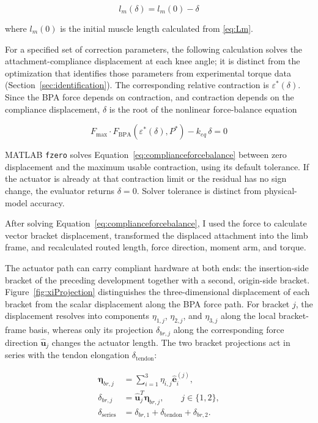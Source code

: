 \begin{equation} l_m(\delta) = l_m{(0)} - \delta
\label{eq:activelengthcorrected}
\end{equation}

where $l_m{(0)}$ is the initial muscle length calculated from \eqref{eq:Lm}.

For a specified set of correction parameters, the following calculation solves the attachment-compliance displacement at each knee angle; it is distinct from the optimization that identifies those parameters from experimental torque data (Section~\ref{sec:identification}). The corresponding relative contraction is $\varepsilon^*(\delta)$. Since the BPA force depends on contraction, and contraction depends on the compliance displacement, $\delta$ is the root of the nonlinear force-balance equation

\begin{equation} F_{\mathrm{max}} \cdot F_{\mathrm{BPA}}\!\left(\varepsilon^*(\delta),P^*\right) - k_{eq}\,\delta = 0
\label{eq:complianceforcebalance}
\end{equation}

MATLAB \texttt{fzero} solves Equation~\eqref{eq:complianceforcebalance} between zero displacement and the maximum usable contraction, using its default tolerance. If the actuator is already at that contraction limit or the residual has no sign change, the evaluator returns $\delta=0$. Solver tolerance is distinct from physical-model accuracy.

After solving Equation~\eqref{eq:complianceforcebalance}, I used the force to calculate vector bracket displacement, transformed the displaced attachment into the limb frame, and recalculated routed length, force direction, moment arm, and torque.

The actuator path can carry compliant hardware at both ends: the insertion-side bracket of the preceding development together with a second, origin-side bracket. Figure~\ref{fig:xiProjection} distinguishes the three-dimensional displacement of each bracket from the scalar displacement along the BPA force path. For bracket $j$, the displacement resolves into components $\eta_{1,j}$, $\eta_{2,j}$, and $\eta_{3,j}$ along the local bracket-frame basis, whereas only its projection $\delta_{br,j}$ along the corresponding force direction $\hat{\mathbf{u}}_j$ changes the actuator length. The two bracket projections act in series with the tendon elongation $\delta_{\mathrm{tendon}}$:

\begin{equation}
\begin{aligned}
\boldsymbol{\eta}_{br,j} &= \sum_{i=1}^{3}\eta_{i,j}\hat{\mathbf{e}}_i^{(j)},\\
\delta_{br,j} &= \hat{\mathbf{u}}_j^T\boldsymbol{\eta}_{br,j}, \qquad j\in\{1,2\},\\
\delta_{\mathrm{series}} &= \delta_{br,1}+\delta_{\mathrm{tendon}}+\delta_{br,2}.
\end{aligned}
\label{eq:bracket_series_projection}
\end{equation}

